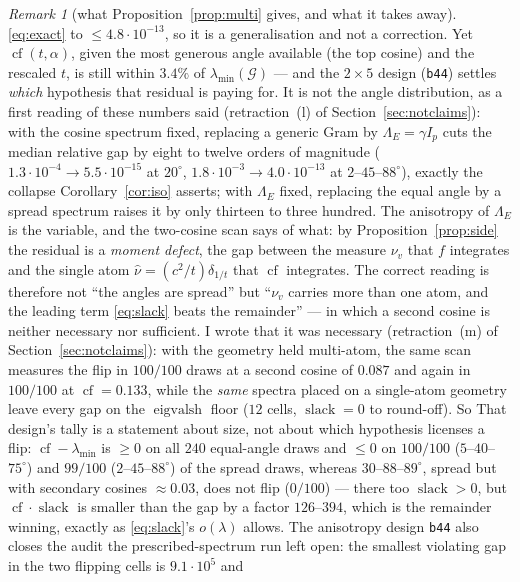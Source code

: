 \documentclass[11pt]{article}
\theoremstyle{remark}
\newtheorem{remark}{Remark}[section]
\newcommand{\Gr}{\mathcal{G}}
\newcommand{\Le}{\Lambda_E}
\begin{document}
\begin{remark}[what Proposition~\ref{prop:multi} gives, and what it takes away]
\eqref{eq:exact} to $\le4.8\cdot10^{-13}$, so it is a generalisation and not a correction. Yet
$\operatorname{cf}(t,\alpha)$, given the most generous angle available (the top cosine) and the
rescaled $t$, is still within $3.4\%$ of $\lambda_{\min}(\Gr)$ --- and the $2\times5$
design (\texttt{b44}) settles \emph{which} hypothesis that residual is paying for. It is not the angle distribution,
as a first reading of these numbers said (retraction~(l) of Section~\ref{sec:notclaims}): with the
cosine spectrum fixed, replacing a generic Gram by $\Le=\gamma I_p$ cuts the median relative gap by
eight to twelve orders of magnitude ($1.3\cdot10^{-4}\!\to\!5.5\cdot10^{-15}$ at $20^\circ$,
$1.8\cdot10^{-3}\!\to\!4.0\cdot10^{-13}$ at $2$--$45$--$88^\circ$), exactly the collapse
Corollary~\ref{cor:iso} asserts; with $\Le$ fixed, replacing the equal angle by a spread spectrum
raises it by only thirteen to three hundred. The anisotropy of $\Le$ is the variable, and
the two-cosine scan says of what: by Proposition~\ref{prop:side} the residual is a \emph{moment defect}, the
gap between the measure $\nu_v$ that $f$ integrates and the single atom $\hat\nu=(c^{2}/t)\delta_{1/t}$
that $\operatorname{cf}$ integrates. The correct reading is therefore not ``the angles are spread'' but
``$\nu_v$ carries more than one atom, and the leading term \eqref{eq:slack} beats the remainder'' ---
in which a second cosine is neither necessary nor sufficient. I wrote that it was necessary
(retraction~(m) of Section~\ref{sec:notclaims}): with the geometry held multi-atom, the same scan
measures the flip in $100/100$ draws at a second cosine of $0.087$ and again in $100/100$ at
$\operatorname{cf}=0.133$, while the \emph{same} spectra placed on a single-atom geometry leave every
gap on the $\operatorname{eigvalsh}$ floor ($12$ cells, $\operatorname{slack}=0$ to round-off). So
That design's tally is a statement about size, not about which hypothesis licenses a flip:
$\operatorname{cf}-\lambda_{\min}$ is $\ge0$ on all $240$ equal-angle draws and $\le0$ on $100/100$
($5$--$40$--$75^\circ$) and $99/100$ ($2$--$45$--$88^\circ$) of the spread draws, whereas
$30$--$88$--$89^\circ$, spread but with secondary cosines $\approx0.03$, does not flip ($0/100$) ---
there too $\operatorname{slack}>0$, but $\operatorname{cf}\cdot\operatorname{slack}$ is smaller than
the gap by a factor $126$--$394$, which is the remainder winning, exactly as \eqref{eq:slack}'s $o(\lambda)$
allows. The anisotropy design \texttt{b44} also closes the audit
the prescribed-spectrum run left open: the smallest violating gap in the two flipping cells is $9.1\cdot10^{5}$ and

\end{remark}
\end{document}
